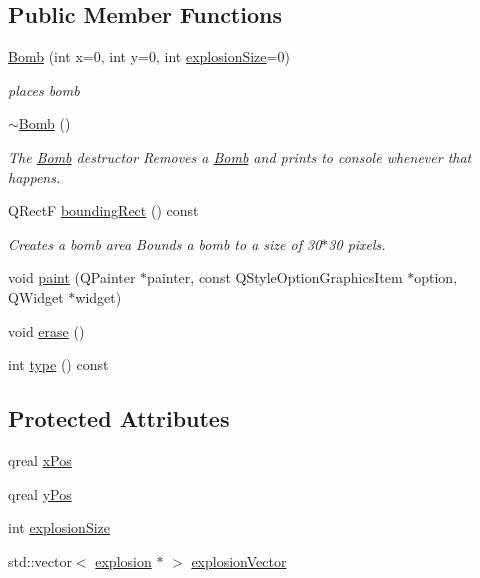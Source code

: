 \subsection*{Public Member Functions}
\begin{DoxyCompactItemize}
\item 
\hyperlink{class_bomb_ada9d05fb30c035691190e80d1d0a1c7f}{Bomb} (int x=0, int y=0, int \hyperlink{class_bomb_a7576bf99d4bcfbc7dda365511ca2fcd7}{explosion\-Size}=0)
\begin{DoxyCompactList}\small\item\em places bomb \end{DoxyCompactList}\item 
\hyperlink{class_bomb_acbb47327cfb2fa429887774ef3597965}{$\sim$\-Bomb} ()
\begin{DoxyCompactList}\small\item\em The \hyperlink{class_bomb}{Bomb} destructor Removes a \hyperlink{class_bomb}{Bomb} and prints to console whenever that happens. \end{DoxyCompactList}\item 
Q\-Rect\-F \hyperlink{class_bomb_ad047941e8f1413a061f98f460dcea22a}{bounding\-Rect} () const 
\begin{DoxyCompactList}\small\item\em Creates a bomb area Bounds a bomb to a size of 30$\ast$30 pixels. \end{DoxyCompactList}\item 
void \hyperlink{class_bomb_ab8e930cc66f5d3f41e8a02f3d0d8185e}{paint} (Q\-Painter $\ast$painter, const Q\-Style\-Option\-Graphics\-Item $\ast$option, Q\-Widget $\ast$widget)
\item 
void \hyperlink{class_bomb_aacd1b797985f1f77e896c69a067126ec}{erase} ()
\item 
int \hyperlink{class_bomb_aa555383c82ad5ea7155e8fccbd9566a8}{type} () const 
\end{DoxyCompactItemize}
\subsection*{Protected Attributes}
\begin{DoxyCompactItemize}
\item 
qreal \hyperlink{class_bomb_ac2068167b771ed338aa17c99524b8131}{x\-Pos}
\item 
qreal \hyperlink{class_bomb_a0d1028a49b33b08f5c96a943fab0beff}{y\-Pos}
\item 
int \hyperlink{class_bomb_a7576bf99d4bcfbc7dda365511ca2fcd7}{explosion\-Size}
\item 
std\-::vector$<$ \hyperlink{classexplosion}{explosion} $\ast$ $>$ \hyperlink{class_bomb_a03d27f3d615aba4b77f83427912a7de6}{explosion\-Vector}
\end{DoxyCompactItemize}


